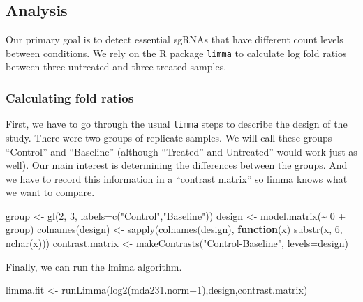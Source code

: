 \documentclass[
]{article}
\newenvironment{Shaded}{\begin{snugshade}}{\end{snugshade}}
\newcommand{\AttributeTok}[1]{\textcolor[rgb]{0.77,0.63,0.00}{#1}}
\newcommand{\ControlFlowTok}[1]{\textcolor[rgb]{0.13,0.29,0.53}{\textbf{#1}}}
\newcommand{\DecValTok}[1]{\textcolor[rgb]{0.00,0.00,0.81}{#1}}
\newcommand{\FunctionTok}[1]{\textcolor[rgb]{0.00,0.00,0.00}{#1}}
\newcommand{\NormalTok}[1]{#1}
\newcommand{\OtherTok}[1]{\textcolor[rgb]{0.56,0.35,0.01}{#1}}
\newcommand{\SpecialCharTok}[1]{\textcolor[rgb]{0.00,0.00,0.00}{#1}}
\newcommand{\StringTok}[1]{\textcolor[rgb]{0.31,0.60,0.02}{#1}}
\begin{document}
\hypertarget{analysis}{%
\subsection{Analysis}\label{analysis}}

Our primary goal is to detect essential sgRNAs that have different count
levels between conditions. We rely on the R package \texttt{limma} to
calculate log fold ratios between three untreated and three treated
samples.

\hypertarget{calculating-fold-ratios}{%
\subsubsection{Calculating fold ratios}\label{calculating-fold-ratios}}

First, we have to go through the usual \texttt{limma} steps to describe
the design of the study. There were two groups of replicate samples. We
will call these groups ``Control'' and ``Baseline'' (although
``Treated'' and Untreated'' would work just as well). Our main interest
is determining the differences between the groups. And we have to record
this information in a ``contrast matrix'' so limma knows what we want to
compare.

\begin{Shaded}
\begin{Highlighting}[]
\NormalTok{group }\OtherTok{\textless{}{-}} \FunctionTok{gl}\NormalTok{(}\DecValTok{2}\NormalTok{, }\DecValTok{3}\NormalTok{, }\AttributeTok{labels=}\FunctionTok{c}\NormalTok{(}\StringTok{"Control"}\NormalTok{,}\StringTok{"Baseline"}\NormalTok{))}
\NormalTok{design }\OtherTok{\textless{}{-}} \FunctionTok{model.matrix}\NormalTok{(}\SpecialCharTok{\textasciitilde{}}  \DecValTok{0} \SpecialCharTok{+}\NormalTok{ group)}
\FunctionTok{colnames}\NormalTok{(design) }\OtherTok{\textless{}{-}} \FunctionTok{sapply}\NormalTok{(}\FunctionTok{colnames}\NormalTok{(design), }\ControlFlowTok{function}\NormalTok{(x) }\FunctionTok{substr}\NormalTok{(x, }\DecValTok{6}\NormalTok{, }\FunctionTok{nchar}\NormalTok{(x)))}
\NormalTok{contrast.matrix }\OtherTok{\textless{}{-}} \FunctionTok{makeContrasts}\NormalTok{(}\StringTok{"Control{-}Baseline"}\NormalTok{, }\AttributeTok{levels=}\NormalTok{design)}
\end{Highlighting}
\end{Shaded}

Finally, we can run the lmima algorithm.

\begin{Shaded}
\begin{Highlighting}[]
\NormalTok{limma.fit }\OtherTok{\textless{}{-}} \FunctionTok{runLimma}\NormalTok{(}\FunctionTok{log2}\NormalTok{(mda231.norm}\SpecialCharTok{+}\DecValTok{1}\NormalTok{),design,contrast.matrix)}
\end{Highlighting}
\end{Shaded}
\end{document}
